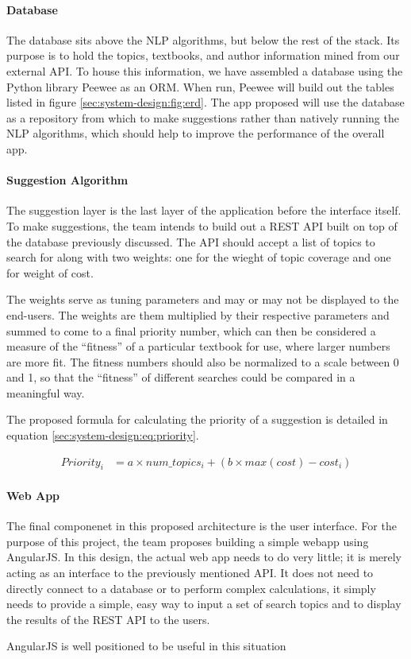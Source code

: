 \paragraph{Database}
The database sits above the NLP algorithms, but below the rest of the
stack.
Its purpose is to hold the topics, textbooks, and author information
mined from our external API.  
To house this information, we have assembled a database using the
Python library Peewee as an ORM.
When run, Peewee will build out the tables listed in figure \ref{sec:system-design:fig:erd}.
The app proposed will use the database as a repository from which to
make suggestions rather than natively running the NLP algorithms,
which should help to improve the performance of the overall app.


\paragraph{Suggestion Algorithm}
The suggestion layer is the last layer of the application before the
interface itself.
To make suggestions, the team intends to build out a REST API built on
top of the database previously discussed.
The API should accept a list of topics to search for along with two
weights: one for the wieght of topic coverage and one for weight of
cost.

The weights serve as tuning parameters and may or may not be displayed
to the end-users.
The weights are them multiplied by their respective parameters and
summed to come to a final priority number, which can then be
considered a measure of the ``fitness'' of a particular textbook for
use, where larger numbers are more fit.
The fitness numbers should also be normalized to a scale between 0 and
1, so that the ``fitness'' of different searches could be compared in
a meaningful way.

The proposed formula for calculating the priority of a suggestion is
detailed in equation \ref{sec:system-design:eq:priority}.


\begin{align}
Priority_i &= a \times num\_topics_i + (b \times max(cost) - cost_i) \label{sec:system-design:eq:priority}
\end{align}

\paragraph{Web App}
The final componenet in this proposed architecture is the user
interface.
For the purpose of this project, the team proposes building a simple
webapp using AngularJS.
In this design, the actual web app needs to do very little; it is
merely acting as an interface to the previously mentioned API.
It does not need to directly connect to a database or to perform
complex calculations, it simply needs to provide a simple, easy way to
input a set of search topics and to display the results of the REST
API to the users.

AngularJS is well positioned to be useful in this situation

